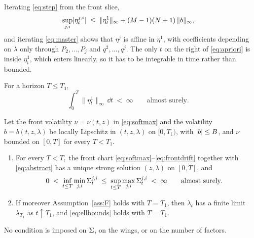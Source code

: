 Iterating \eqref{eq:step} from the front slice,
\begin{equation}\label{eq:apriori}
  \sup_{j,i}\lvert \eta^{j,i}_{t}\rvert
  \;\le\;\lVert\eta^1_t\rVert_\infty+(M-1)(N+1)\,\lVert b\rVert_\infty ,
\end{equation}
and iterating \eqref{eq:master} shows that $\eta^j$ is affine in $\eta^1$, with
coefficients depending on $\lambda$ only through $P_2,\dots,P_j$ and $q^2,\dots,q^j$.
The only $t$ on the right of \eqref{eq:apriori} is inside $\eta^1_t$, which enters
linearly, so it has to be integrable in time rather than bounded.

\begin{assumption}\label{ass:F}
For a horizon $T\le T_1$,
\begin{equation}\label{eq:F}
  \int_0^{T}\lVert\eta^{1}_t\rVert_\infty\,\dd t\;<\;\infty\qquad\text{almost surely.}
\end{equation}
\end{assumption}

\begin{theorem}[Existence]\label{thm:exist}
Let the front volatility $\nu=\nu(t,z)$ in \eqref{eq:softmax} and the volatility
$b=b(t,z,\lambda)$ be locally Lipschitz in $(t,z,\lambda)$ on $[0,T_1)$, with
$\lvert b\rvert\le B$, and $\nu$ bounded on $[0,T]$ for every $T<T_1$.
\begin{enumerate}[label=(\roman*),leftmargin=2em,itemsep=1pt]
\item For every $T<T_1$ the front chart \eqref{eq:softmax}--\eqref{eq:frontdrift}
  together with \eqref{eq:abstract} has a unique strong solution $(z,\lambda)$ on
  $[0,T]$, and
  \begin{equation}\label{eq:ellbounds}
    0\;<\;\inf_{t\le T}\min_{j,i}\Sigma^{j,i}_{t}
    \;\le\;\sup_{t\le T}\max_{j,i}\Sigma^{j,i}_{t}\;<\;\infty
    \qquad\text{almost surely.}
  \end{equation}
\item If moreover Assumption~\ref{ass:F} holds with $T=T_1$, then $\lambda_t$ has a
  finite limit $\lambda_{T_1}$ as $t\uparrow T_1$, and \eqref{eq:ellbounds} holds with
  $T=T_1$.
\end{enumerate}
No condition is imposed on $\Sigma$, on the wings, or on the number of factors.
\end{theorem}

